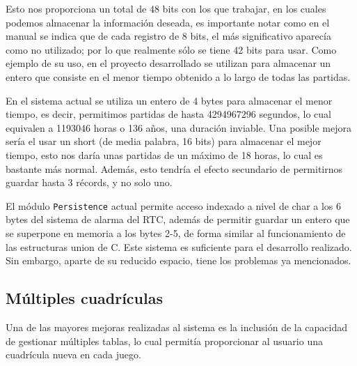 \documentclass[12pt,letterpaper]{article}
\begin{document}
Esto nos proporciona un total de 48 bits con los que trabajar, en los
cuales podemos almacenar la información deseada, es importante notar
como en el manual se indica que de cada registro de 8 bits, el más
significativo aparecía como no utilizado\footnotemark; por lo que
realmente sólo se tiene 42 bits para usar. Como ejemplo de su uso, en
el proyecto desarrollado se utilizan para almacenar un entero que
consiste en el menor tiempo obtenido a lo largo de todas las
partidas.\\



En el sistema actual se utiliza un entero de 4 bytes para almacenar el
menor tiempo, es decir, permitimos partidas de hasta 4294967296
segundos, lo cual equivalen a 1193046 horas o 136 años, una duración
inviable. Una posible mejora sería el usar un short (de media palabra,
16 bits) para almacenar el mejor tiempo, esto nos daría unas partidas
de un máximo de 18 horas, lo cual es bastante más normal. Además, esto
tendría el efecto secundario de permitirnos guardar hasta 3 récords, y
no solo uno.

El módulo \texttt{Persistence} actual permite acceso indexado a nivel
de char a los 6 bytes del sistema de alarma del RTC, además de
permitir guardar un entero que se superpone en memoria a los bytes
2-5, de forma similar al funcionamiento de las estructuras union de
C. Este sistema es suficiente para el desarrollo realizado. Sin
embargo, aparte de su reducido espacio, tiene los problemas ya
mencionados.

\subsection{Múltiples cuadrículas}
\label{subsec:multiples-cuadriculas}
Una de las mayores mejoras realizadas al sistema es la inclusión de la
capacidad de gestionar múltiples tablas, lo cual permitía proporcionar
al usuario una cuadrícula nueva en cada juego.
\end{document}
